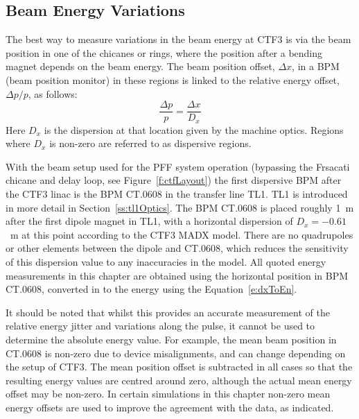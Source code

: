 \subsection{Beam Energy Variations}
\label{ss:energyVariations}

The best way to measure variations in the beam energy at CTF3 is via the beam position in one of the chicanes or rings, where the position after a bending magnet depends on the beam energy. The beam position offset, \(\Delta x\), in a BPM (beam position monitor) in these regions is linked to the relative energy offset, \(\Delta p / p\), as follows:
\begin{equation}
\frac{\Delta p}{p} = \frac{\Delta x}{D_x}
\label{e:dxToEn}
\end{equation}
Here \(D_{x}\) is the dispersion at that location given by the machine optics. Regions where \(D_{x}\) is non-zero are referred to as dispersive regions.

With the beam setup used for the PFF system operation (bypassing the Frsacati chicane and delay loop, see Figure~\ref{f:ctfLayout}) the first dispersive BPM after the CTF3 linac is the BPM CT.0608 in the transfer line TL1.  TL1 is introduced in more detail in Section~\ref{ss:tl1Optics}. The BPM CT.0608 is placed roughly 1~m after the first dipole magnet in TL1, with a horizontal dispersion of \(D_{x} = -0.61\)~m at this point according to the CTF3 MADX model. There are no quadrupoles or other elements between the dipole and CT.0608, which reduces the sensitivity of this dispersion value to any inaccuracies in the model. All quoted energy measurements in this chapter are obtained using the horizontal position in BPM CT.0608, converted in to the energy using the Equation~\ref{e:dxToEn}. %

It should be noted that whilst this provides an accurate measurement of the relative energy jitter and variations along the pulse, it cannot be used to determine the absolute energy value. For example, the mean beam position in CT.0608 is non-zero due to device misalignments, and can change depending on the setup of CTF3. The mean position offset is subtracted in all cases so that the resulting energy values are centred around zero, although the actual mean energy offset may be non-zero. In certain simulations in this chapter non-zero mean energy offsets are used to improve the agreement with the data, as indicated.

